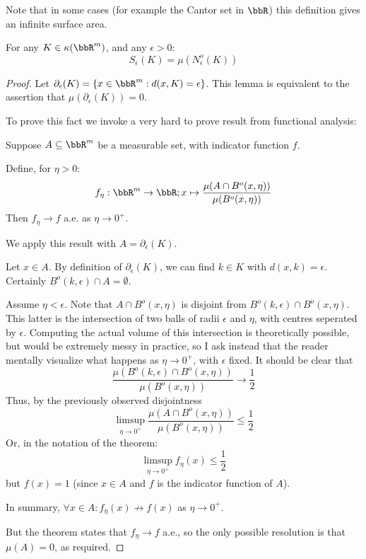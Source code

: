 \documentclass[a4paper,11pt]{article}
\begin{document}
Note that in some cases (for example the Cantor set in $\bbR$) this definition
gives an infinite surface area.

\begin{lemma}
\label{thm:openNeighbourhoods}
For any $K\in\kappa(\bbR^m)$, and any $\epsilon>0$:
\[
S_\epsilon(K)=\mu(N_\epsilon^o(K))
\]
\end{lemma}

\begin{proof}
Let $\partial_\epsilon(K)=\{x\in\bbR^m:d(x,K)=\epsilon\}$.  This lemma is
equivalent to the assertion that $\mu(\partial_\epsilon(K))=0$.

To prove this fact we invoke a very hard to prove result from functional
analysis:

\begin{thm}
Suppose $A\subseteq\bbR^m$ be a measurable set, with indicator function $f$.

Define, for $\eta>0$:
\[
f_\eta:\bbR^m\to\bbR;x\mapsto\frac{\mu(A\cap B^o(x,\eta))}{\mu(B^o(x,\eta))}
\]
Then $f_\eta\to f$ a.e. as $\eta\to0^+$.
\end{thm}

We apply this result with $A=\partial_\epsilon(K)$.

Let $x\in A$.  By definition of $\partial_\epsilon(K)$, we can find $k\in K$
with $d(x,k)=\epsilon$.  Certainly $B^o(k,\epsilon)\cap A=\emptyset$.

Assume $\eta<\epsilon$.  Note that $A\cap B^o(x,\eta)$ is disjoint from
$B^o(k,\epsilon)\cap B^o(x,\eta)$.  This latter is the intersection of two
balls of radii $\epsilon$ and $\eta$, with centres seperated by $\epsilon$.
Computing the actual volume of this intersection is theoretically possible, but
would be extremely messy in practice, so I ask instead that the reader
mentally visualize what happens as $\eta\to0^+$, with $\epsilon$ fixed.
It should be clear that
\[
\frac{\mu(B^o(k,\epsilon)\cap B^o(x,\eta))}{\mu(B^o(x,\eta))}\to\frac{1}{2}
\]
Thus, by the previously observed disjointness
\[
\limsup_{\eta\to0^+}\frac{\mu(A\cap B^o(x,\eta))}{\mu(B^o(x,\eta))}
  \leq\frac{1}{2}
\]
Or, in the notation of the theorem:
\[
\limsup_{\eta\to0^+}f_\eta(x)\leq\frac{1}{2}
\]
but $f(x)=1$ (since $x\in A$ and $f$ is the indicator function of $A$).

In summary, $\forall x\in A:f_\eta(x)\not\to f(x)$ as $\eta\to0^+$.

But the theorem states that $f_\eta\to f$ a.e., so the only possible resolution
is that $\mu(A)=0$, as required.
\end{proof}
\end{document}
